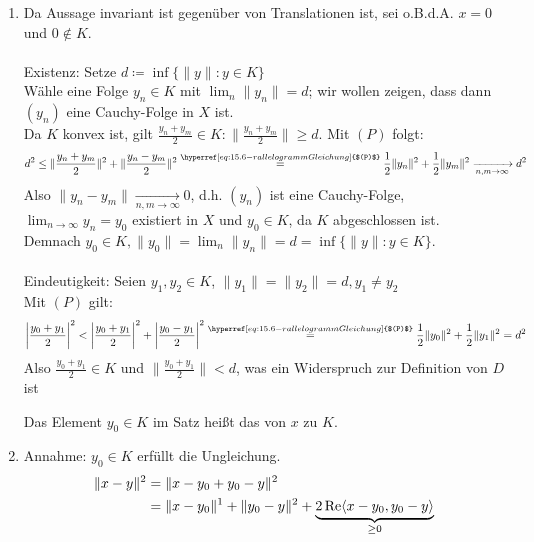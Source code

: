 \begin{beweis}
	\begin{enumerate}[label=\alph*\upshape)]
		\item Da Aussage invariant ist gegenüber von Translationen ist, sei o.B.d.A. $x = 0$ und $0 \notin K$. \\ \\
			Existenz: Setze $d \coloneqq \inf \{ \| y \| : y \in K \}$ \\
			Wähle eine Folge $y_{n} \in K$ mit $\lim_{n} \| y_{n} \| = d$; wir wollen zeigen, dass dann $(y_{n})$ eine Cauchy-Folge in $X$ ist. \\
			Da $K$ konvex ist, gilt $\frac{y_{n} + y_{m}}{2} \in K: \| \frac{y_{n} + y_{m}}{2} \| \geq d$. Mit \hyperref[eq:15.6-rallelogrammGleichung]{$(P)$} folgt:
			\[ d^{2} \leq \| \frac{y_{n} + y_{m}}{2} \|^{2} + \| \frac{y_{n} - y_{m}}{2} \|^{2} \overset{\hyperref[eq:15.6-rallelogrammGleichung]{$(P)$}}{=} \frac{1}{2} \| y_{n} \|^{2} + \frac{1}{2} \| y_{m} \|^{2} \xrightarrow[n, m \rightarrow \infty]{} d^{2} \]
			Also $\| y_{n} - y_{m} \| \xrightarrow[n, m \rightarrow \infty]{} 0$, d.h. $(y_{n})$ ist eine Cauchy-Folge, $\lim_{n \rightarrow \infty} y_{n} = y_{0}$ existiert in $X$ und $y_{0} \in K$, da $K$ abgeschlossen ist. \\
			Demnach $y_{0} \in K, \| y_{0} \| = \lim_{n} \| y_{n} \| = d = \inf \{ \| y \| : y \in K \}$. \\ \\
			Eindeutigkeit: Seien $y_{1}, y_{2} \in K$, $\|y_{1} \| = \|y_{2} \| = d, y_{1} \neq y_{2}$ \\
			Mit \hyperref[eq:15.6-rallelogrammGleichung]{$(P)$} gilt:
			\[ \left| \frac{y_{0} + y_{1}}{2} \right|^{2} < \left| \frac{y_{0} + y_{1}}{2} \right|^{2} + \left| \frac{y_{0} - y_{1}}{2} \right|^{2} \overset{\hyperref[eq:15.6-rallelogrammGleichung]{$(P)$}}{=} \frac{1}{2} \| y_{0} \|^{2} + \frac{1}{2} \| y_{1} \|^{2} = d^{2} \]
			Also $\frac{y_{0} + y_{1}}{2} \in K$ und $ \| \frac{y_{0} + y_{1}}{2} \| < d$, was ein Widerspruch zur Definition von $D$ ist
			\begin{vereinbarung}
				Das Element $y_{0} \in K$ im Satz hei{\ss}t das  von $x$ zu $K$.
			\end{vereinbarung}
		\item Annahme: $y_{0} \in K$ erfüllt die Ungleichung. 
			\begin{align*}
				\| x - y \|^{2} & = \| x - y_{0} + y_{0} - y \|^{2} \\
								& = \| x - y_{0} \|^{1} + \| y_{0} - y \|^{2} + \underbrace{2 \Re \< x - y_{0}, y_{0} - y \>}_{ \geq 0} \\

\end{align*}
\end{enumerate}
\end{beweis}
